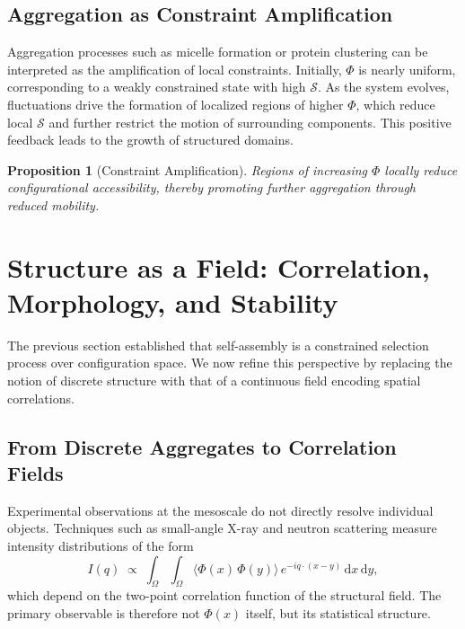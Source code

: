 \documentclass[11pt, a4paper, twocolumn]{article}
\newtheorem{proposition}[definition]{Proposition}
\newcommand{\Sfield}{\mathcal{S}}
\begin{document}
\subsection{Aggregation as Constraint Amplification}

Aggregation processes such as micelle formation or protein clustering can be
interpreted as the amplification of local constraints. Initially, $\Phi$ is
nearly uniform, corresponding to a weakly constrained state with high $\Sfield$.
As the system evolves, fluctuations drive the formation of localized regions of
higher $\Phi$, which reduce local $\Sfield$ and further restrict the motion of
surrounding components. This positive feedback leads to the growth of structured
domains.

\begin{proposition}[Constraint Amplification]
Regions of increasing $\Phi$ locally reduce configurational accessibility,
thereby promoting further aggregation through reduced mobility.
\end{proposition}

\section{Structure as a Field: Correlation, Morphology, and Stability}

The previous section established that self-assembly is a constrained selection
process over configuration space. We now refine this perspective by replacing
the notion of discrete structure with that of a continuous field encoding
spatial correlations.

\subsection{From Discrete Aggregates to Correlation Fields}

Experimental observations at the mesoscale do not directly resolve individual
objects. Techniques such as small-angle X-ray and neutron scattering measure
intensity distributions of the form
\begin{equation}
    I(q) \;\propto\; \int_{\Omega} \int_{\Omega}
    \langle \Phi(x)\,\Phi(y) \rangle \,
    e^{-i q \cdot (x - y)} \,\mathrm{d}x\,\mathrm{d}y,
    \label{eq:saxs}
\end{equation}
which depend on the two-point correlation function of the structural field.
The primary observable is therefore not $\Phi(x)$ itself, but its statistical
structure.
\end{document}
